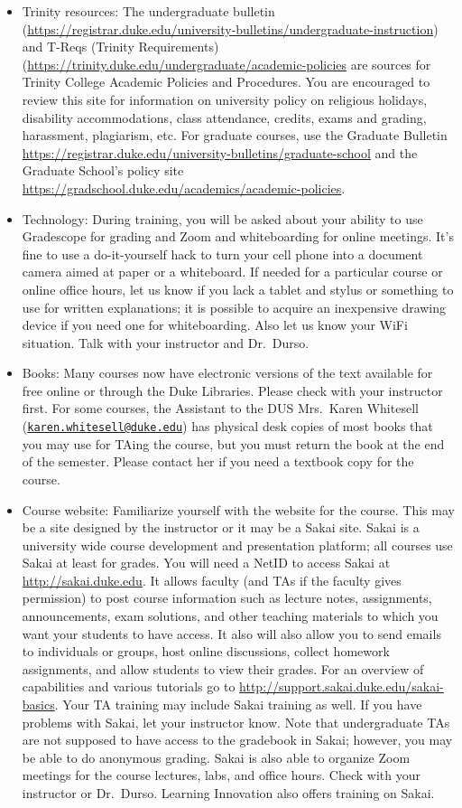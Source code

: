 \documentclass[
]{article}
\begin{document}
\begin{itemize}
\item
  Trinity resources: The undergraduate bulletin (\url{https://registrar.duke.edu/university-bulletins/undergraduate-instruction}) and T-Reqs (Trinity Requirements) (\url{https://trinity.duke.edu/undergraduate/academic-policies} are sources for Trinity College Academic Policies and Procedures. You are encouraged to review this site for information on university policy on religious holidays, disability accommodations, class attendance, credits, exams and grading, harassment, plagiarism, etc. For graduate courses, use the Graduate Bulletin \url{https://registrar.duke.edu/university-bulletins/graduate-school} and the Graduate School's policy site \url{https://gradschool.duke.edu/academics/academic-policies}.
\item
  Technology: During training, you will be asked about your ability to use Gradescope for grading and Zoom and whiteboarding for online meetings. It's fine to use a do-it-yourself hack to turn your cell phone into a document camera aimed at paper or a whiteboard. If needed for a particular course or online office hours, let us know if you lack a tablet and stylus or something to use for written explanations; it is possible to acquire an inexpensive drawing device if you need one for whiteboarding. Also let us know your WiFi situation. Talk with your instructor and Dr.~Durso.
\item
  Books: Many courses now have electronic versions of the text available for free online or through the Duke Libraries. Please check with your instructor first. For some courses, the Assistant to the DUS Mrs.~Karen Whitesell (\href{mailto:karen.whitesell@duke.edu}{\nolinkurl{karen.whitesell@duke.edu}}) has physical desk copies of most books that you may use for TAing the course, but you must return the book at the end of the semester. Please contact her if you need a textbook copy for the course.
\item
  Course website: Familiarize yourself with the website for the course. This may be a site designed by the instructor or it may be a Sakai site. Sakai is a university wide course development and presentation platform; all courses use Sakai at least for grades. You will need a NetID to access Sakai at \url{http://sakai.duke.edu}. It allows faculty (and TAs if the faculty gives permission) to post course information such as lecture notes, assignments, announcements, exam solutions, and other teaching materials to which you want your students to have access. It also will also allow you to send emails to individuals or groups, host online discussions, collect homework assignments, and allow students to view their grades. For an overview of capabilities and various tutorials go to \url{http://support.sakai.duke.edu/sakai-basics}. Your TA training may include Sakai training as well. If you have problems with Sakai, let your instructor know. Note that undergraduate TAs are not supposed to have access to the gradebook in Sakai; however, you may be able to do anonymous grading. Sakai is also able to organize Zoom meetings for the course lectures, labs, and office hours. Check with your instructor or Dr.~Durso. Learning Innovation also offers training on Sakai.

\end{itemize}
\end{document}
